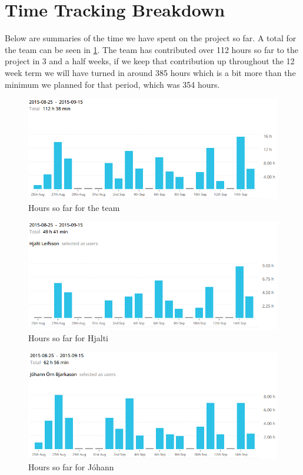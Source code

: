\section{Time Tracking Breakdown }\label{sec:time}

Below are summaries of the time we have spent on the project so far. A total for the team can be seen in \ref{fig:team}. The team has contributed over 112 hours so far to the project in 3 and a half weeks, if we keep that contribution up throughout the 12 week term we will have turned in around 385 hours which is a bit more than the minimum we planned for that period, which was 354 hours. 

\begin{figure}[H]
	\centering

    \centerline{\includegraphics[scale=0.7]{team.png}}
    \caption{\label{fig:team}Hours so far for the team}
\end{figure}

\begin{figure}[H]
	\centering

    \centerline{\includegraphics[scale=0.7]{hjalti.png}}
    \caption{\label{fig:hjalti}Hours so far for Hjalti}
\end{figure}

\begin{figure}[H]
	\centering

    \centerline{\includegraphics[scale=0.7]{johann.png}}
    \caption{\label{fig:johann}Hours so far for Jóhann}
\end{figure}

